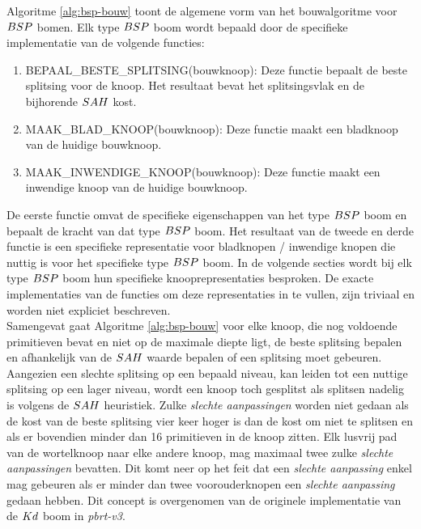 Algoritme \ref{alg:bsp-bouw} toont de algemene vorm van het bouwalgoritme voor $BSP$ bomen.
Elk type $BSP$ boom wordt bepaald door de specifieke implementatie van de volgende functies:
\begin{enumerate}
    \item BEPAAL\_BESTE\_SPLITSING(bouwknoop): Deze functie bepaalt de beste splitsing voor de knoop. Het resultaat bevat het splitsingsvlak en de bijhorende $SAH$ kost.
    \item MAAK\_BLAD\_KNOOP(bouwknoop): Deze functie maakt een bladknoop van de huidige bouwknoop.
    \item MAAK\_INWENDIGE\_KNOOP(bouwknoop): Deze functie maakt een inwendige knoop van de huidige bouwknoop.
\end{enumerate}
De eerste functie omvat de specifieke eigenschappen van het type $BSP$ boom en bepaalt de kracht van dat type $BSP$ boom. 
Het resultaat van de tweede en derde functie is een specifieke representatie voor bladknopen / inwendige knopen die nuttig is voor het specifieke type $BSP$ boom.
In de volgende secties wordt bij elk type $BSP$ boom hun specifieke knooprepresentaties besproken.
De exacte implementaties van de functies om deze representaties in te vullen, zijn triviaal en worden niet expliciet beschreven.\\


Samengevat gaat Algoritme \ref{alg:bsp-bouw} voor elke knoop, die nog voldoende primitieven bevat en niet op de maximale diepte ligt, de beste splitsing bepalen en afhankelijk van de $SAH$ waarde bepalen of een splitsing moet gebeuren. 
Aangezien een slechte splitsing op een bepaald niveau, kan leiden tot een nuttige splitsing op een lager niveau, wordt een knoop toch gesplitst als splitsen nadelig is volgens de $SAH$ heuristiek.
Zulke \textit{slechte aanpassingen} worden niet gedaan als de kost van de beste splitsing vier keer hoger is dan de kost om niet te splitsen en als er bovendien minder dan 16 primitieven in de knoop zitten.
Elk lusvrij pad van de wortelknoop naar elke andere knoop, mag maximaal twee zulke \textit{slechte aanpassingen} bevatten.
Dit komt neer op het feit dat een \textit{slechte aanpassing} enkel mag gebeuren als er minder dan twee voorouderknopen een \textit{slechte aanpassing} gedaan hebben.
Dit concept is overgenomen van de originele implementatie van de $Kd$ boom in \textit{pbrt-v3}.

